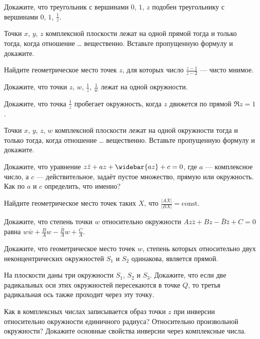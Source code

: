 \documentclass[a4paper, 12pt, num=23]{listok}
\begin{document}
\begin{problem}
	Докажите, что треугольник с вершинами $0$, $1$, $z$ подобен треугольнику с вершинами $0$, $1$, $\frac1z$.
\end{problem}
\begin{problem}
	Точки $x$, $y$, $z$ комплексной плоскости лежат на одной прямой тогда и только тогда, когда отношение \ldots{} вещественно. Вставьте пропущенную формулу и докажите.
\end{problem}
\begin{problem}
	Найдите геометрическое место точек $z$, для которых число $\frac{z-1}{z-2}$ --- чисто мнимое.
\end{problem}
\begin{problem}
	Докажите, что точки $z$, $w$, $\frac1z$, $\frac1w$ лежат на одной окружности.
\end{problem}
\begin{problem}
	Докажите, что точка $\frac1z$ пробегает окружность, когда $z$ движется по прямой $\Re z = 1$.
\end{problem}
\begin{problem}
	Точки $x$, $y$, $z$, $w$ комплексной плоскости лежат на одной окружности тогда и только тогда, когда отношение \ldots{} вещественно.
	Вставьте пропущенную формулу и докажите.
\end{problem}
\begin{problem}
	Докажите, что уравнение $z\bar z + az + \widebar{az} + c = 0$, где $a$ --- комплексное число,
	а $c$ --- действительное, задаёт пустое множество, прямую или окружность. Как по $a$ и $c$ определить, что именно?
\end{problem}
\begin{problem}
	Найдите геометрическое место точек таких $X$, что $\frac{|AX|}{|BX|} = \mathrm{const}$.
\end{problem}
\begin{problem}
	Докажите, что степень точки $w$ относительно окружности $Az\bar z + Bz - \bar B \bar z + C = 0$ равна
	$w\bar w + \frac B A w - \frac{\bar B}A w + \frac C A$.
\end{problem}
\begin{problem}
	Докажите, что геометрическое место точек $w$, степень которых относительно двух неконцентрических окружностей $S_1$ и $S_2$ одинакова, является прямой.
\end{problem}
\begin{problem}
	На плоскости даны три окружности $S_1$, $S_2$ и $S_3$.
	Докажите, что если две радикальных оси этих окружностей пересекаются в точке $Q$, то третья радикальная ось также проходит через эту точку.
\end{problem}
\begin{problem}
	Как в комплексных числах записывается образ точки $z$ при инверсии относительно окружности единичного радиуса?
	Относительно произвольной окружности? Докажите основные свойства инверсии через комплексные числа.
\end{problem}
\end{document}
